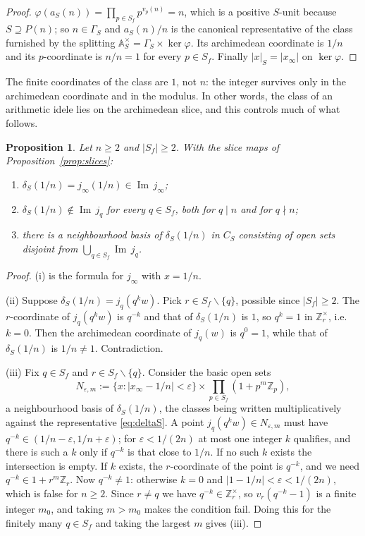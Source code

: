 \documentclass[11pt]{amsart}
\newtheorem{proposition}[theorem]{Proposition}
\theoremstyle{definition}
\theoremstyle{remark}
\newcommand{\Z}{\mathbb Z}
\newcommand{\A}{\mathbb A}
\newcommand{\Iml}{\operatorname{Im}}
\begin{document}
\begin{proof}
$\varphi(a_S(n))=\prod_{p\in S_f}p^{v_p(n)}=n$, which is a positive $S$-unit
because $S\supseteq P(n)$; so $n\in\Gamma_S$ and $a_S(n)/n$ is the canonical
representative of the class furnished by the splitting
$\A_S^\times=\Gamma_S\times\ker\varphi$. Its archimedean coordinate is $1/n$
and its $p$-coordinate is $n/n=1$ for every $p\in S_f$. Finally
$|x|_S=|x_\infty|$ on $\ker\varphi$.
\end{proof}

The finite coordinates of the class are $1$, not $n$: the integer survives only
in the archimedean coordinate and in the modulus.  In other words, the class
of an arithmetic idele lies on the archimedean slice, and this controls much
of what follows.

\begin{proposition}\label{prop:noslice}
Let $n\ge2$ and $|S_f|\ge2$. With the slice maps of
Proposition~\ref{prop:slices}:
\begin{enumerate}
\item[(i)] $\delta_S(1/n)=j_\infty(1/n)\in\Iml\,j_\infty$;
\item[(ii)] $\delta_S(1/n)\notin\Iml\,j_q$ for \emph{every} $q\in S_f$, both
for $q\mid n$ and for $q\nmid n$;
\item[(iii)] there is a neighbourhood basis of $\delta_S(1/n)$ in $C_S$
consisting of open sets disjoint from $\bigcup_{q\in S_f}\Iml\,j_q$.
\end{enumerate}
\end{proposition}

\begin{proof}
(i) is the formula for $j_\infty$ with $x=1/n$.

(ii) Suppose $\delta_S(1/n)=j_q(q^kw)$. Pick $r\in S_f\smallsetminus\{q\}$,
possible since $|S_f|\ge2$. The $r$-coordinate of $j_q(q^kw)$ is $q^{-k}$ and
that of $\delta_S(1/n)$ is $1$, so $q^{k}=1$ in $\Z_r^\times$, i.e. $k=0$.
Then the archimedean coordinate of $j_q(w)$ is $q^0=1$, while that of
$\delta_S(1/n)$ is $1/n\ne1$. Contradiction.

(iii) Fix $q\in S_f$ and $r\in S_f\smallsetminus\{q\}$. Consider the basic
open sets
\[
  N_{\varepsilon,m}:=\{x:|x_\infty-1/n|<\varepsilon\}\times
     \prod_{p\in S_f}(1+p^m\Z_p),
\]
a neighbourhood basis of $\delta_S(1/n)$, the classes being written
multiplicatively against the representative \eqref{eq:deltaS}. A point
$j_q(q^kw)\in N_{\varepsilon,m}$ must have
$q^{-k}\in(1/n-\varepsilon,1/n+\varepsilon)$; for $\varepsilon<1/(2n)$ at most
one integer $k$ qualifies, and there is such a $k$ only if $q^{-k}$ is that
close to $1/n$. If no such $k$ exists the intersection is empty. If $k$
exists, the $r$-coordinate of the point is $q^{-k}$, and we need
$q^{-k}\in1+r^m\Z_r$. Now $q^{-k}\ne1$: otherwise $k=0$ and
$|1-1/n|<\varepsilon<1/(2n)$, which is false for $n\ge2$. Since $r\ne q$ we
have $q^{-k}\in\Z_r^\times$, so $v_r(q^{-k}-1)$ is a finite integer $m_0$, and
taking $m>m_0$ makes the condition fail. Doing this for the finitely many
$q\in S_f$ and taking the largest $m$ gives (iii).
\end{proof}
\end{document}

